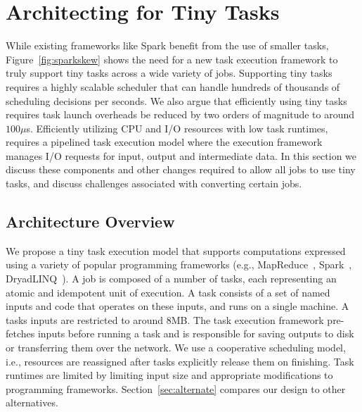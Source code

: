 \section{Architecting for Tiny Tasks}
\label{sec:architecture}
While existing frameworks like Spark benefit from the use of smaller tasks, Figure~\ref{fig:sparkskew}
shows the need for a new task execution framework to truly support tiny tasks across a wide
variety of jobs.
Supporting tiny tasks requires a highly scalable scheduler that can handle hundreds 
of thousands of scheduling decisions per seconds. We also argue that efficiently using
tiny tasks requires task launch overheads be reduced by two orders of magnitude to around $100\mu$s.
Efficiently utilizing CPU and I/O resources with low task runtimes, requires
a pipelined task execution model where the execution framework manages I/O
requests for input, output and intermediate data. In this section
we discuss these components and other changes required to allow all jobs to use
tiny tasks, and discuss challenges associated with converting certain jobs.

\subsection{Architecture Overview}
We propose a tiny task execution model that supports computations expressed using 
a variety of popular programming frameworks (e.g., MapReduce~\cite{dean2008mapreduce},
Spark~\cite{zaharia2010spark}, DryadLINQ~\cite{yu2008dryadlinq}). 
A job is composed of a number of tasks, each representing an atomic
and idempotent unit of execution. A task consists of a set of named inputs
and code that operates on these inputs, and runs on a single machine.
A tasks inputs are restricted to around 8MB. The task execution framework
pre-fetches inputs before running a task and is responsible for saving
outputs to disk or transferring them over the network.  We use a cooperative 
scheduling model, i.e., resources are reassigned after tasks explicitly release 
them on finishing. Task runtimes are limited by limiting input size and
appropriate modifications to programming frameworks. Section~\ref{sec:alternate} 
compares our design to other alternatives.

